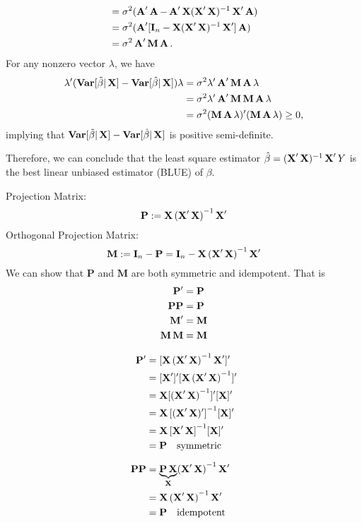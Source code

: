 \documentclass[UTF8,a4paper,10pt]{article}
\begin{document}
\begin{solution}
\begin{equation*}
\begin{aligned}
        &=\sigma^2(\A'\A-\A'\X(\X'\X)^{-1}\X'\A)\\
        &=\sigma^2(\A'[\mathbf{I}_n-\X(\X'\X)^{-1}\X']\A)\\
        &=\sigma^2\A'\M\A.
      \end{aligned}
    \end{equation*}
    For any nonzero vector \(\lambda\), we have
    \begin{equation*}
      \begin{aligned}
        \lambda' (\Var[\tilde{\beta}|\X]-\Var[\hat{\beta}|\X]) \lambda 
        &=  \sigma^2 \lambda' \A'\M\A \lambda\\
        &= \sigma^2 \lambda' \A'\M\M\A \lambda\\
        &= \sigma^2(\M\A \lambda)' (\M\A \lambda)\geq 0,
      \end{aligned}
    \end{equation*}
    implying that \(\Var[\tilde{\beta}|\X]-\Var[\hat{\beta}|\X]\) is positive semi-definite.

    Therefore, we can conclude that the least square estimator \(\hat{\beta} = (\X'\X)^{-1}\X'Y\) is the best linear unbiased estimator (BLUE) of \(\beta\).



    \begin{mybox}{}
      Projection Matrix:
      \[\mathbf{P}:=\X{(\X'\X)}^{-1}\X'\]
      Orthogonal Projection Matrix:
      \[\M:=\mathbf{I}_n-\mathbf{P} =\mathbf{I}_n- \X{(\X'\X)}^{-1}\X'\]
      We can show that $\mathbf{P}$ and $\mathbf{M}$ are both symmetric and idempotent. That is 
      \begin{align*}
          \mathbf{P}' &= \mathbf{P}\\
          \mathbf{P}\mathbf{P} &= \mathbf{P}\\
          \M' &= \M\\
          \M\M &= \M
      \end{align*}

      \dotfill
    \begin{multicols*}{2}
      \begin{align*}
        \mathbf{P}' &=[\X{(\X'\X)}^{-1}\X']'\\
        & = [\X']'[\X{(\X'\X)}^{-1}]'\\
        & = \X[{(\X'\X)}^{-1}]'[\X]'\\
        & = \X{[(\X'\X)']}^{-1}[\X]'\\
        & = \X{[\X'\X]}^{-1}[\X]'\\
        &= \mathbf{P} \quad\text{symmetric}
\\[6pt]
        \mathbf{P}\mathbf{P} &=\underset{\X}{\underbrace{\mathbf{P}\X}}{(\X'\X)}^{-1}\X'\\
        &=\X{(\X'\X)}^{-1}\X'
        \\
        &= \mathbf{P}\quad\text{idempotent}
      \end{align*}


\end{multicols*}
\end{mybox}
\end{solution}
\end{document}
